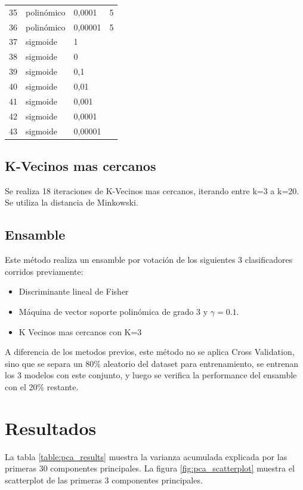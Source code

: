 \documentclass[journal]{IEEEtran}
\begin{document}
\begin{table}[ht!]
\begin{tabular}{l | l l l }
35 & polinómico & 0,0001  & 5 \\ 
36 & polinómico & 0,00001  & 5 \\ 
37 & sigmoide & 1 &  \\ 
38 & sigmoide & 0 &  \\ 
39 & sigmoide & 0,1 &  \\ 
40 & sigmoide & 0,01 &  \\ 
41 & sigmoide & 0,001 &  \\ 
42 & sigmoide & 0,0001 &  \\ 
43 & sigmoide & 0,00001 &  \\ 
\end{tabular}
\end{table}

\subsection{K-Vecinos mas cercanos}
Se realiza 18 iteraciones de K-Vecinos mas cercanos, iterando entre k=3
a k=20. Se utiliza la distancia de Minkowski.

\subsection{Ensamble}
Este método realiza un ensamble por votación de los siguientes 3
clasificadores corridos previamente:

\begin{itemize}
\item Discriminante lineal de Fisher
\item Máquina de vector soporte polinómica de grado 3 y $\gamma=0.1$. 
\item K Vecinos mas cercanos con K=3
\end{itemize}

A diferencia de los metodos previos, este método no se aplica
Cross Validation, sino que se separa un 80\% aleatorio del dataset para 
entrenamiento, se entrenan los 3 modelos con este conjunto, y luego
se verifica la performance del ensamble con el 20\% restante.

\section{Resultados}

La tabla \ref{table:pca_results} muestra la varianza acumulada explicada 
por las primeras 30 componentes principales. La figura \ref{fig:pca_scatterplot}
muestra el scatterplot de las primeras 3 componentes principales.
\end{document}
